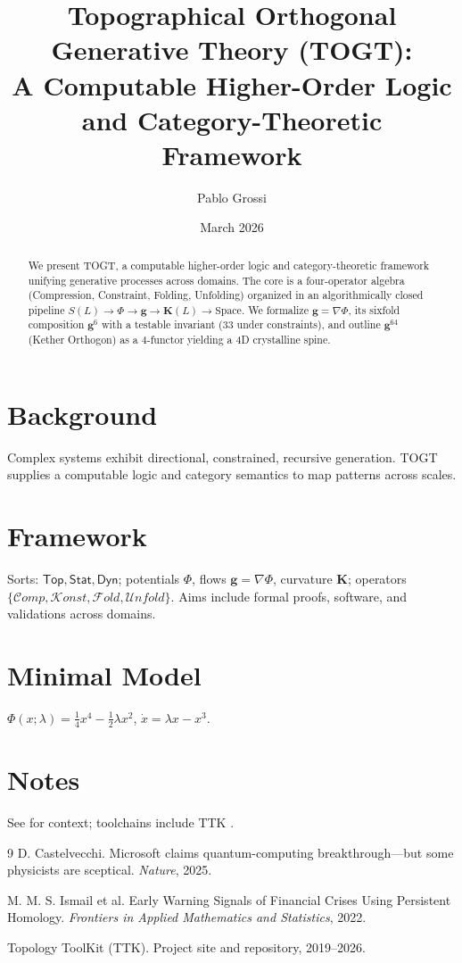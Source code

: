 \documentclass[11pt]{article}
\title{Topographical Orthogonal Generative Theory (TOGT):\\A Computable Higher-Order Logic and Category-Theoretic Framework}
\author{Pablo Grossi}
\date{March 2026}
\newcommand{\g}{\boldsymbol{g}}
\newcommand{\K}{\boldsymbol{K}}
\newcommand{\Top}{\mathsf{Top}}
\newcommand{\Stat}{\mathsf{Stat}}
\newcommand{\Dyn}{\mathsf{Dyn}}
\newcommand{\Comp}{\mathcal{C}\!omp}
\newcommand{\Konst}{\mathcal{K}\!onst}
\newcommand{\Fold}{\mathcal{F}\!old}
\newcommand{\Unfold}{\mathcal{U}\!nfold}
\begin{document}
\maketitle

\begin{abstract}
We present TOGT, a computable higher-order logic and category-theoretic framework unifying generative processes across domains. The core is a four-operator algebra (Compression, Constraint, Folding, Unfolding) organized in an algorithmically closed pipeline $S(L)\to\Phi\to\g\to\K(L)\to\text{Space}$. We formalize $\g=\nabla\Phi$, its sixfold composition $\g^{6}$ with a testable invariant (33 under constraints), and outline $\g^{64}$ (Kether Orthogon) as a 4-functor yielding a 4D crystalline spine.
\end{abstract}

\section{Background}
Complex systems exhibit directional, constrained, recursive generation. TOGT supplies a computable logic and category semantics to map patterns across scales.

\section{Framework}
Sorts: $\Top,\Stat,\Dyn$; potentials $\Phi$, flows $\g=\nabla\Phi$, curvature $\K$; operators $\{\Comp,\Konst,\Fold,\Unfold\}$. Aims include formal proofs, software, and validations across domains.

\section{Minimal Model}
$\Phi(x;\lambda)=\tfrac14 x^4-\tfrac12\lambda x^2$, $\dot{x}=\lambda x-x^3$.

\section{Notes}
See \cite{castelvecchi2025microsoft,ismail2022ewsph} for context; toolchains include TTK \cite{ttk}.

\begin{thebibliography}{9}
D. Castelvecchi. Microsoft claims quantum-computing breakthrough---but some physicists are sceptical. \emph{Nature}, 2025.

M. M. S. Ismail et al. Early Warning Signals of Financial Crises Using Persistent Homology. \emph{Frontiers in Applied Mathematics and Statistics}, 2022.

Topology ToolKit (TTK). Project site and repository, 2019--2026.
\end{thebibliography}
\end{document}
